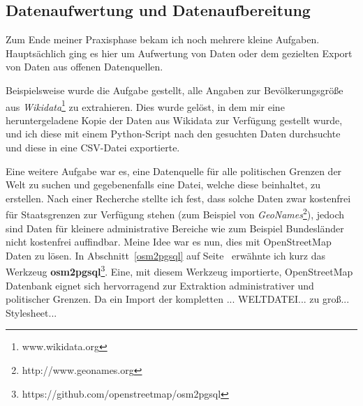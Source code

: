 \subsection{Datenaufwertung und Datenaufbereitung}
Zum Ende meiner Praxisphase bekam ich noch mehrere kleine Aufgaben.
Hauptsächlich ging es hier um Aufwertung von Daten oder dem gezielten Export von Daten aus offenen Datenquellen.

Beispielsweise wurde die Aufgabe gestellt, alle Angaben zur Bevölkerungsgröße aus \textit{Wikidata}\footnote{www.wikidata.org} zu extrahieren.
Dies wurde gelöst, in dem mir eine heruntergeladene Kopie der Daten aus Wikidata zur Verfügung gestellt wurde, und ich diese mit einem Python-Script nach den gesuchten Daten durchsuchte und diese in eine CSV-Datei exportierte.

Eine weitere Aufgabe war es, eine Datenquelle für alle politischen Grenzen der Welt zu suchen und gegebenenfalls eine Datei, welche diese beinhaltet, zu erstellen.
Nach einer Recherche stellte ich fest, dass solche Daten zwar kostenfrei für Staatsgrenzen zur Verfügung stehen (zum Beispiel von \textit{GeoNames}\footnote{http://www.geonames.org}), jedoch sind Daten für kleinere administrative Bereiche wie zum Beispiel Bundesländer nicht kostenfrei auffindbar. Meine Idee war es nun, dies mit OpenStreetMap Daten zu lösen. In Abschnitt~\ref{osm2pgsql} auf Seite~\pageref{osm2pgsql} erwähnte ich kurz das Werkzeug \textbf{osm2pgsql}\footnote{https://github.com/openstreetmap/osm2pgsql}. Eine, mit diesem Werkzeug importierte, OpenStreetMap Datenbank eignet sich hervorragend zur Extraktion administrativer und politischer Grenzen. Da ein Import der kompletten ... WELTDATEI... zu groß... Stylesheet...